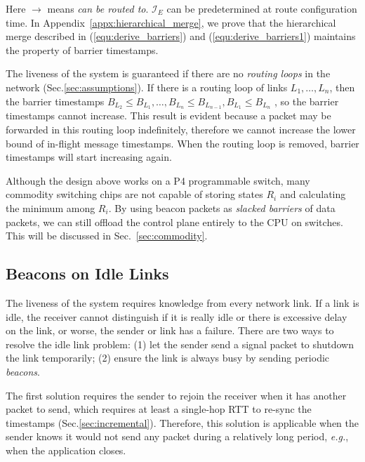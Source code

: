 Here $\rightarrow$ means \textit{can be routed to}.
$\mathcal{I}_E$ can be predetermined at route configuration time.
In Appendix~\ref{appx:hierarchical_merge}, we prove that the hierarchical merge described in (\ref{equ:derive_barriers}) and (\ref{equ:derive_barriers1}) maintains the property of barrier timestamps.

{The liveness of the system is guaranteed if there are no \textit{routing loops} in the network (Sec.\ref{sec:assumptions}).}
If there is a routing loop of links $L_1, \ldots , L_n$, then the barrier timestamps $B_{L_2} \leq B_{L_1}, \ldots, B_{L_n} \leq B_{L_{n-1}}, B_{L_1} \leq B_{L_n}$
{, so the barrier timestamps cannot increase.
This result is evident because a packet may be forwarded in this routing loop indefinitely, therefore we cannot increase the lower bound of in-flight message timestamps.}
When the routing loop is removed, barrier timestamps will start increasing again.

Although the design above works on a P4 programmable switch, many commodity switching chips are not capable of storing states $R_i$ and calculating the minimum among $R_i$.
By using beacon packets as \textit{slacked barriers} of data packets, we can still offload the control plane entirely to the CPU on switches. This will be discussed in Sec.~\ref{sec:commodity}.

\subsection{Beacons on Idle Links}
\label{sec:beacon}

The liveness of the system requires knowledge from every network link. If a link is idle, the receiver cannot distinguish if it is really idle or there is excessive delay on the link, or worse, the sender or link has a failure. There are two ways to resolve the idle link problem: (1) let the sender send a signal packet to shutdown the link temporarily; (2) ensure the link is always busy by sending periodic \textit{beacons}.

The first solution requires the sender to rejoin the receiver when it has another packet to send, which requires at least a single-hop RTT to re-sync the timestamps (Sec.\ref{sec:incremental}). Therefore, this solution is applicable when the sender knows it would not send any packet during a relatively long period, \textit{e.g.}, when the application closes.

